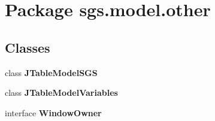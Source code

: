 \section{Package sgs.\-model.\-other}
\label{namespacesgs_1_1model_1_1other}
\subsection*{Classes}
\begin{DoxyCompactItemize}
\item 
class {\bf J\-Table\-Model\-S\-G\-S}
\item 
class {\bf J\-Table\-Model\-Variables}
\item 
interface {\bf Window\-Owner}
\end{DoxyCompactItemize}
